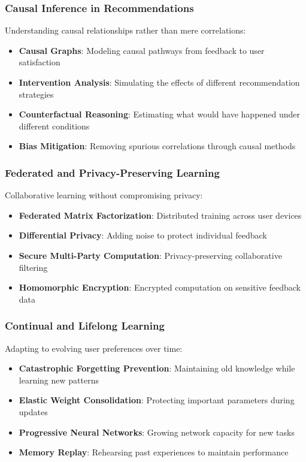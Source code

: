 \subsubsection{Causal Inference in Recommendations}

Understanding causal relationships rather than mere correlations:

\begin{itemize}
    \item \textbf{Causal Graphs}: Modeling causal pathways from feedback to user satisfaction
    \item \textbf{Intervention Analysis}: Simulating the effects of different recommendation strategies
    \item \textbf{Counterfactual Reasoning}: Estimating what would have happened under different conditions
    \item \textbf{Bias Mitigation}: Removing spurious correlations through causal methods
\end{itemize}

\subsubsection{Federated and Privacy-Preserving Learning}

Collaborative learning without compromising privacy:

\begin{itemize}
    \item \textbf{Federated Matrix Factorization}: Distributed training across user devices
    \item \textbf{Differential Privacy}: Adding noise to protect individual feedback
    \item \textbf{Secure Multi-Party Computation}: Privacy-preserving collaborative filtering
    \item \textbf{Homomorphic Encryption}: Encrypted computation on sensitive feedback data
\end{itemize}

\subsubsection{Continual and Lifelong Learning}

Adapting to evolving user preferences over time:

\begin{itemize}
    \item \textbf{Catastrophic Forgetting Prevention}: Maintaining old knowledge while learning new patterns
    \item \textbf{Elastic Weight Consolidation}: Protecting important parameters during updates
    \item \textbf{Progressive Neural Networks}: Growing network capacity for new tasks
    \item \textbf{Memory Replay}: Rehearsing past experiences to maintain performance
\end{itemize}

